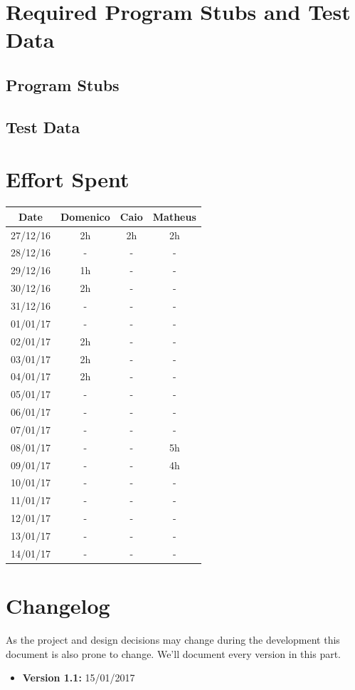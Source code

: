 \documentclass[a4paper]{article}
\begin{document}
\section{Required Program Stubs and Test Data}
\subsection{Program Stubs}
\subsection{Test Data}

\newpage
\section{Effort Spent}
\begin{tabular}{ | c | c | c | c | }
\hline
	\textbf {Date} & \textbf {Domenico} & \textbf {Caio} & \textbf {Matheus} \\ \hline
	27/12/16& 2h & 2h & 2h  \\ \hline
	28/12/16& - & - & - \\ \hline
	29/12/16& 1h & - & - \\ \hline
	30/12/16& 2h & - & - \\ \hline
	31/12/16& - & - & - \\ \hline
	01/01/17& - & - & - \\ \hline
	02/01/17& 2h & - & - \\ \hline
	03/01/17& 2h & - & - \\ \hline
	04/01/17& 2h & - & - \\ \hline
	05/01/17& - & - & - \\ \hline
	06/01/17& - & - & - \\ \hline
	07/01/17& - & - & - \\ \hline
	08/01/17& - & - & 5h \\ \hline
	09/01/17& - & - & 4h \\ \hline
	10/01/17& - & - & - \\ \hline
	11/01/17& - & - & - \\ \hline
	12/01/17& - & - & - \\ \hline
	13/01/17& - & - & - \\ \hline
	14/01/17& - & - & - \\ \hline
\end{tabular}
\newpage

\section{Changelog}
As the project and design decisions may change during the development this document is also prone to change.
We'll document every version in this part.
\begin{itemize}
\item \textbf {Version 1.1:} 15/01/2017
\end{itemize}
\end{document}

